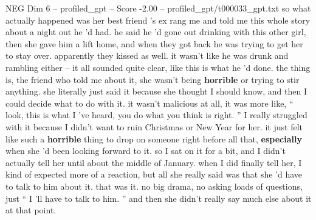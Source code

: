 \begin{textsample}{NEG Dim 6 – profiled\_gpt – Score -2.00 – profiled\_gpt/t000033\_gpt.txt}  \label{ex:f6_neg_013}
so what actually happened was her best friend 's ex rang me and told me this whole story about a night out he 'd had. he said he 'd gone out drinking with this other girl, then she gave him a lift home, and when they got back he was trying to get her to stay over. apparently they kissed as well. it wasn't like he was drunk and rambling either – it all sounded quite clear, like this is what he 'd done. the thing is, the friend who told me about it, she wasn't being \textbf{horrible} or trying to stir anything. she literally just said it because she thought I should know, and then I could decide what to do with it. it wasn't malicious at all, it was more like, “ look, this is what I ’ve heard, you do what you think is right. ” I really struggled with it because I didn't want to ruin Christmas or New Year for her. it just felt like such a \textbf{horrible} thing to drop on someone right before all that, \textbf{especially} when she ’d been looking forward to it. so I sat on it for a bit, and I didn't actually tell her until about the middle of January. when I did finally tell her, I kind of expected more of a reaction, but all she really said was that she ’d have to talk to him about it. that was it. no big drama, no asking loads of questions, just “ I ’ll have to talk to him. ” and then she didn't really say much else about it at that point.

\end{textsample}
